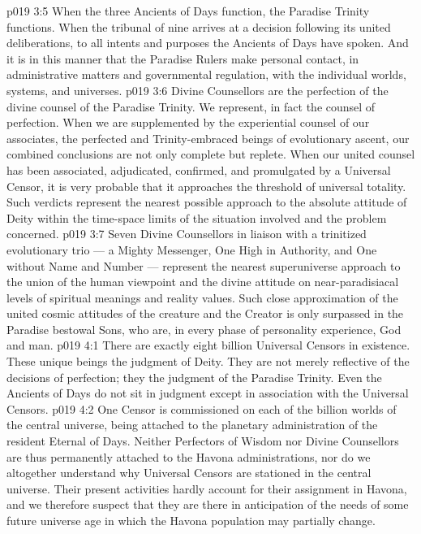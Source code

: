 \vs p019 3:5 When the three Ancients of Days function, the Paradise Trinity functions. When the tribunal of nine arrives at a decision following its united deliberations, to all intents and purposes the Ancients of Days have spoken. And it is in this manner that the Paradise Rulers make personal contact, in administrative matters and governmental regulation, with the individual worlds, systems, and universes.
\vs p019 3:6 \pc Divine Counsellors are the perfection of the divine counsel of the Paradise Trinity. We represent, in fact  the counsel of perfection. When we are supplemented by the experiential counsel of our associates, the perfected and Trinity\hyp{}embraced beings of evolutionary ascent, our combined conclusions are not only complete but replete. When our united counsel has been associated, adjudicated, confirmed, and promulgated by a Universal Censor, it is very probable that it approaches the threshold of universal totality. Such verdicts represent the nearest possible approach to the absolute attitude of Deity within the time\hyp{}space limits of the situation involved and the problem concerned.
\vs p019 3:7 Seven Divine Counsellors in liaison with a trinitized evolutionary trio --- a Mighty Messenger, One High in Authority, and One without Name and Number --- represent the nearest superuniverse approach to the union of the human viewpoint and the divine attitude on near\hyp{}paradisiacal levels of spiritual meanings and reality values. Such close approximation of the united cosmic attitudes of the creature and the Creator is only surpassed in the Paradise bestowal Sons, who are, in every phase of personality experience, God and man.
\vs p019 4:1 There are exactly eight billion Universal Censors in existence. These unique beings  the judgment of Deity. They are not merely reflective of the decisions of perfection; they  the judgment of the Paradise Trinity. Even the Ancients of Days do not sit in judgment except in association with the Universal Censors.
\vs p019 4:2 One Censor is commissioned on each of the billion worlds of the central universe, being attached to the planetary administration of the resident Eternal of Days. Neither Perfectors of Wisdom nor Divine Counsellors are thus permanently attached to the Havona administrations, nor do we altogether understand why Universal Censors are stationed in the central universe. Their present activities hardly account for their assignment in Havona, and we therefore suspect that they are there in anticipation of the needs of some future universe age in which the Havona population may partially change.
